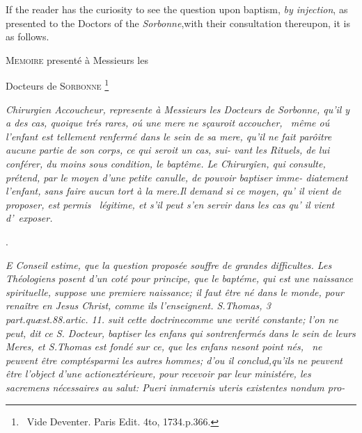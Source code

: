 \documentclass{article}
\begin{document}
\bigskip

\bgroup\fontsize{8}{11}\selectfont
If the reader has
the curiosity to see the question upon baptism, \textit{by injection}, as presented
to the Doctors of the \textit{Sorbonne},\tsk with their consultation thereupon, it is as
follows.\par\egroup

\newpage\null\smallskip
\centerline{\textsc{Memoire} presenté à Messieurs les}
\centerline{Docteurs de \textsc{Sorbonne} \footnote{\ Vide Deventer. Paris Edit. 4to,
1734.\@ p.\@ 366.}}

\bgroup\itshape\setlength{\baselineskip}{13pt}
Chirurgien Accoucheur, represente à\break 
Messieurs les Docteurs de \textnormal{Sorbonne},\break 
qu’il y a des cas, quoique trés rares, oú une\break
mere ne sçauroit accoucher, \et\ même oú\break
l’enfant est tellement renfermé dans le sein\break
de sa mere, qu’il ne fait parôitre aucune\break
partie de son corps, ce qui seroit un cas, sui-\break
vant les Rituels, de lui conférer, du moins\break
sous condition, le baptême. Le Chirurgîen,\break
qui consulte, prétend, par le moyen d’une\break
\textnormal{petite canulle,} de pouvoir baptiser imme-\break
diatement l’enfant, sans faire aucun tort à\break
la mere.\tsh  Il demand si ce moyen, qu’ il\break
vient de proposer, est permis \et\ légitime, et\break
s’il peut s’en servir dans les cas qu’ il vient\break
d’~exposer.\egroup

\bigskip{}
\newpage\null\smallskip
\centerline{.}

\bgroup\fontsize{9.6}{13}\selectfont\itshape
E Conseil estime, que la question proposée 
souffre de grandes difficultes. Les Théo\-logiens 
posent d’un coté pour principe, que\break
le baptéme, qui est une naissance spirituelle,\break
suppose une premiere naissance; il faut être né\break
dans le monde, pour renaître en \textnormal{Jesus Christ},\break
comme ils l’enseignent. S.\@ \textnormal{Thomas, 3 part.\break quæst.\@ 88.\@ artic.\@
11.\@} suit cette doctrine\break comme une verité constante; l’on ne peut, dit ce S.
Docteur, baptiser les enfans qui sont\break renfermés dans le sein de leurs Meres,
et S.\break \textnormal{Thomas} est fondé sur ce, que les enfans ne\break sont
point nés, \et\ ne peuvent être comptés\break parmi les autres hommes; d’ou il
conclud,\break qu’ils ne peuvent être l’object d’une action\break extérieure, pour
recevoir par leur ministére, les sacremens nécessaires au salut: 
\textnormal{Pueri in\break maternis uteris existentes nondum pro-}\break
{}
\egroup
\end{document}
